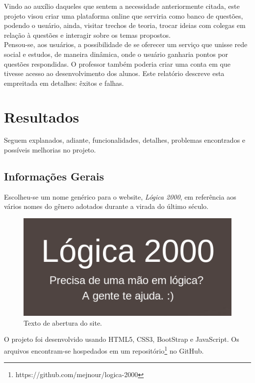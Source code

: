 \documentclass[11pt, a4paper]{article}
\begin{document}
		Vindo ao auxílio daqueles que sentem a necessidade anteriormente citada, este projeto visou criar uma plataforma online que serviria como banco de questões, podendo o usuário, ainda, visitar trechos de teoria, trocar ideias com colegas em relação à questões e interagir sobre os temas propostos.\\

		Pensou-se, aos usuários, a possibilidade de se oferecer um serviço que unisse rede social e estudos, de maneira dinâmica, onde o usuário ganharia pontos por questões respondidas. O professor também poderia criar uma conta em que tivesse acesso ao desenvolvimento dos alunos. Este relatório descreve esta empreitada em detalhes: êxitos e falhas.

	\section{Resultados}

		Seguem explanados, adiante, funcionalidades, detalhes, problemas encontrados e possíveis melhorias no projeto.

		\subsection{Informações Gerais}

			Escolheu-se um nome genérico para o website, \emph{Lógica 2000}, em referência aos vários nomes do gênero adotados durante a virada do último século.\\

				\begin{figure}[!h]
					\centering
					\includegraphics[scale=.6]{print1.png}
					\caption{Texto de abertura do site.}
				\end{figure}

			O projeto foi desenvolvido usando HTML5, CSS3, BootStrap e JavaScript. Os arquivos encontram-se hospedados em um repositório\footnote{https://github.com/mejnour/logica-2000} no GitHub.\\
\end{document}
